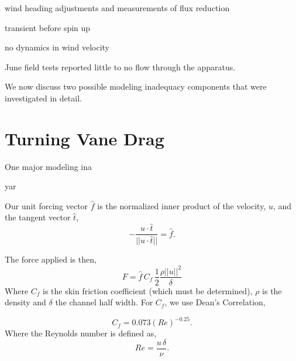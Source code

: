 wind heading adjustments and measurements of flux reduction

transient before spin up

no dynamics in wind velocity

June field tests reported little to no flow through the apparatus. 

We now discuss two possible modeling inadequacy components that were
investigated in detail. 

\section{Turning Vane Drag}

One major modeling ina


yar


Our unit forcing vector $\hat f$ is the normalized inner product of the 
velocity, $u$, and the tangent vector $\hat t$, 
\begin{equation}
- \frac{u \cdot \hat t}{|| u \cdot \hat t ||} = \hat f. 
\end{equation}

The force applied is then, 
\begin{equation}
 F = \hat f \, C_f \, \frac{1}{2} \frac{\rho || u ||^2}{\delta}
\end{equation}
Where $C_f$ is the skin friction coefficient (which must be determined),
$\rho $ is the density and $\delta$ the channel half width. 
For $C_f$, we use Dean's Correlation\cite{johnson1998handbook}, 

%
%
%
\begin{equation}
 C_f = 0.073 (Re)^{-0.25}. 
\end{equation}
Where the Reynolds number is defined as, 
\begin{equation}
 Re = \frac{u\, \delta}{\nu}.
\end{equation}

